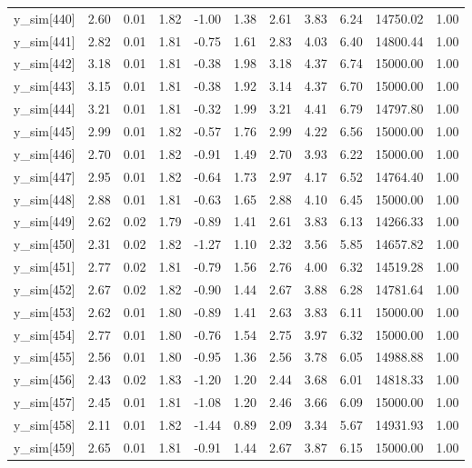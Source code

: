 \begin{table}[ht]
\begin{tabular}{rrrrrrrrrrr}
  y\_sim[440] & 2.60 & 0.01 & 1.82 & -1.00 & 1.38 & 2.61 & 3.83 & 6.24 & 14750.02 & 1.00 \\ 
  y\_sim[441] & 2.82 & 0.01 & 1.81 & -0.75 & 1.61 & 2.83 & 4.03 & 6.40 & 14800.44 & 1.00 \\ 
  y\_sim[442] & 3.18 & 0.01 & 1.81 & -0.38 & 1.98 & 3.18 & 4.37 & 6.74 & 15000.00 & 1.00 \\ 
  y\_sim[443] & 3.15 & 0.01 & 1.81 & -0.38 & 1.92 & 3.14 & 4.37 & 6.70 & 15000.00 & 1.00 \\ 
  y\_sim[444] & 3.21 & 0.01 & 1.81 & -0.32 & 1.99 & 3.21 & 4.41 & 6.79 & 14797.80 & 1.00 \\ 
  y\_sim[445] & 2.99 & 0.01 & 1.82 & -0.57 & 1.76 & 2.99 & 4.22 & 6.56 & 15000.00 & 1.00 \\ 
  y\_sim[446] & 2.70 & 0.01 & 1.82 & -0.91 & 1.49 & 2.70 & 3.93 & 6.22 & 15000.00 & 1.00 \\ 
  y\_sim[447] & 2.95 & 0.01 & 1.82 & -0.64 & 1.73 & 2.97 & 4.17 & 6.52 & 14764.40 & 1.00 \\ 
  y\_sim[448] & 2.88 & 0.01 & 1.81 & -0.63 & 1.65 & 2.88 & 4.10 & 6.45 & 15000.00 & 1.00 \\ 
  y\_sim[449] & 2.62 & 0.02 & 1.79 & -0.89 & 1.41 & 2.61 & 3.83 & 6.13 & 14266.33 & 1.00 \\ 
  y\_sim[450] & 2.31 & 0.02 & 1.82 & -1.27 & 1.10 & 2.32 & 3.56 & 5.85 & 14657.82 & 1.00 \\ 
  y\_sim[451] & 2.77 & 0.02 & 1.81 & -0.79 & 1.56 & 2.76 & 4.00 & 6.32 & 14519.28 & 1.00 \\ 
  y\_sim[452] & 2.67 & 0.02 & 1.82 & -0.90 & 1.44 & 2.67 & 3.88 & 6.28 & 14781.64 & 1.00 \\ 
  y\_sim[453] & 2.62 & 0.01 & 1.80 & -0.89 & 1.41 & 2.63 & 3.83 & 6.11 & 15000.00 & 1.00 \\ 
  y\_sim[454] & 2.77 & 0.01 & 1.80 & -0.76 & 1.54 & 2.75 & 3.97 & 6.32 & 15000.00 & 1.00 \\ 
  y\_sim[455] & 2.56 & 0.01 & 1.80 & -0.95 & 1.36 & 2.56 & 3.78 & 6.05 & 14988.88 & 1.00 \\ 
  y\_sim[456] & 2.43 & 0.02 & 1.83 & -1.20 & 1.20 & 2.44 & 3.68 & 6.01 & 14818.33 & 1.00 \\ 
  y\_sim[457] & 2.45 & 0.01 & 1.81 & -1.08 & 1.20 & 2.46 & 3.66 & 6.09 & 15000.00 & 1.00 \\ 
  y\_sim[458] & 2.11 & 0.01 & 1.82 & -1.44 & 0.89 & 2.09 & 3.34 & 5.67 & 14931.93 & 1.00 \\ 
  y\_sim[459] & 2.65 & 0.01 & 1.81 & -0.91 & 1.44 & 2.67 & 3.87 & 6.15 & 15000.00 & 1.00 \\ 

\end{tabular}
\end{table}
